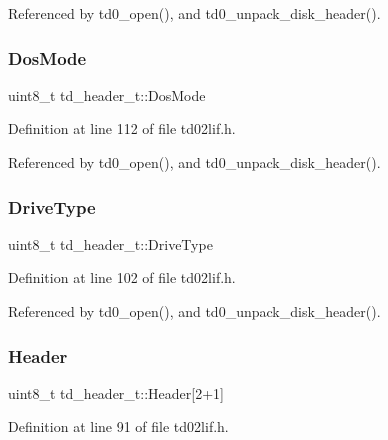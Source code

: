 Referenced by td0\+\_\+open(), and td0\+\_\+unpack\+\_\+disk\+\_\+header().

\mbox{\label{structtd__header__t_acb0710bd6f98290ea2490ce678b63894}} 
\subsubsection{\texorpdfstring{Dos\+Mode}{DosMode}}
{\footnotesize\ttfamily uint8\+\_\+t td\+\_\+header\+\_\+t\+::\+Dos\+Mode}



Definition at line 112 of file td02lif.\+h.



Referenced by td0\+\_\+open(), and td0\+\_\+unpack\+\_\+disk\+\_\+header().

\mbox{\label{structtd__header__t_a865bd11809e67fd4ca8f1af0c46d9600}} 
\subsubsection{\texorpdfstring{Drive\+Type}{DriveType}}
{\footnotesize\ttfamily uint8\+\_\+t td\+\_\+header\+\_\+t\+::\+Drive\+Type}



Definition at line 102 of file td02lif.\+h.



Referenced by td0\+\_\+open(), and td0\+\_\+unpack\+\_\+disk\+\_\+header().

\mbox{\label{structtd__header__t_a41510629d6bb7852f4e1e43443c38edd}} 
\subsubsection{\texorpdfstring{Header}{Header}}
{\footnotesize\ttfamily uint8\+\_\+t td\+\_\+header\+\_\+t\+::\+Header\mbox{[}2+1\mbox{]}}



Definition at line 91 of file td02lif.\+h.



